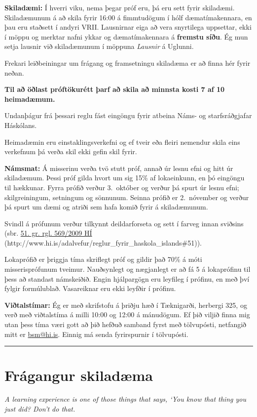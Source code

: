\documentclass[a4paper,10pt,icelandic]{sphinxmanual}
\begin{document}
\textbf{Skiladæmi:} Í hverri viku, nema þegar próf eru, þá eru sett fyrir
skiladæmi. Skiladæmunum á að skila fyrir 16:00 á fimmtudögum í hólf
dæmatímakennara, en þau eru staðsett í andyri VRII. Lausnirnar eiga að
vera snyrtilega uppsettar, ekki í möppu og merktar nafni ykkar og
dæmatímakennara á \textbf{fremstu síðu}. Ég mun setja lausnir við
skiladæmunum í möppuna \emph{Lausnir} á Uglunni.

Frekari leiðbeiningar um frágang og framsetningu skiladæma er að finna
hér fyrir neðan.

\begin{center}\textbf{Til að öðlast próftökurétt þarf að skila
að minnsta kosti 7 af 10 heimadæmum.}
\end{center}
Undanþágur frá þessari reglu fást eingöngu fyrir atbeina Náms- og starfsráðgjafar Háskólans.

Heimadæmin eru einstaklingsverkefni og ef tveir eða fleiri nemendur skila
eins verkefnum þá verða skil ekki gefin skil fyrir.

\textbf{Námsmat:} Á misserinu verða tvö stutt próf, annað úr lesnu efni og
hitt úr skiladæmum. Þessi próf gilda hvort um sig 15\% af lokaeinkunn, en
þó eingöngu til hækkunar. Fyrra prófið verður 3. október og verður þá
spurt úr lesnu efni; skilgreiningum, setningum og sönnunum. Seinna
prófið er 2. nóvember og verður þá spurt um dæmi og atriði sem hafa
komið fyrir á skiladæmunum.

Svindl á prófunum verður
tilkynnt deildarforseta og sett í
farveg innan sviðsins (sbr.
\href{http://www.hi.is/adalvefur/reglur\_fyrir\_haskola\_islands\#51}{51. gr. rgl. 569/2009 HÍ} (http://www.hi.is/adalvefur/reglur\_fyrir\_haskola\_islands\#51)).

Lokaprófið er þriggja tíma skriflegt próf og gildir það 70\% á móti
misserisprófunum tveimur. Nauðsynlegt og nægjanlegt er að fá 5 á
lokaprófinu til þess að standast námskeiðið. Engin hjálpargögn eru
leyfileg í prófinu, en með því fylgir formúlublað.
Vasareiknar eru ekki leyfðir í prófinu.

\textbf{Viðtalstímar:} Ég er með skrifstofu á þriðju hæð í Tæknigarði,
herbergi 325, og verð með viðtalstíma á milli 10:00 og 12:00 á
mánudögum. Ef þið viljið finna mig utan þess tíma væri gott að þið
hefðuð samband fyrst með tölvupósti, netfangið mitt er \href{mailto:bsm@hi.is}{bsm@hi.is}. Einnig
má senda fyrirspurnir í tölvupósti.


\bigskip\hrule{}\bigskip

\newpage

\section{Frágangur skiladæma}
\label{vidauki:fragangur-skiladaema}
\emph{A learning experience is one of those things that says,
`You know that thing you just did? Don't do that.}
\end{document}
